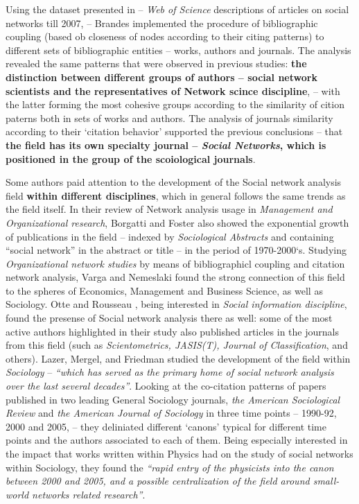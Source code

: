 \documentclass[11pt]{article} %
\begin{document}
Using the dataset presented in \citep{Understand} -- \textit{Web of Science} descriptions of articles on social networks till 2007, -- Brandes \citep{brandes} implemented the procedure of bibliographic coupling (based ob closeness of nodes according to their citing patterns) to different sets of bibliographic entities -- works, authors and journals. The analysis revealed the same patterns that were observed in previous studies: \textbf{the distinction between different groups of authors -- social network scientists and the representatives of Network scince discipline}, -- with the latter forming the most cohesive groups according to the similarity of cition paterns both in sets of works and authors. The analysis of journals similarity according to their `citation behavior' supported the previous conclusions\citep{normSci, leydes} -- that \textbf{the field has its own specialty journal -- \textit{Social Networks}, which is positioned in the group of the scoiological journals}.\medskip  

Some authors paid attention to the development of the Social network analysis field \textbf{within different disciplines}, which in general follows the same trends as the field itself. In their review of Network analysis usage in \textit{Management and Organizational research}, Borgatti and Foster \citep{borgatti} also showed the exponential growth of publications in the field -- indexed by \textit{Sociological Abstracts} and containing “social network” in the abstract or title -- in the period of 1970-2000`s. Studying \textit{Organizational network studies} by means of bibliographicl coupling and citation network analysis, Varga and Nemeslaki \citep{varga} found the strong connection of this field to the spheres of Economics, Management and Business Science, as well as Sociology. Otte and Rousseau \citep{SNAinf}, being interested in \textit{Social information discipline}, found the presense of Social network analysis there as well: some of the most active authors highlighted in their study also published articles in the journals from this field (such as \textit{Scientometrics, JASIS(T), Journal of Classification}, and others). Lazer, Mergel, and Friedman \citep{lazer} studied the development of the field within \textit{Sociology} -- \textit{``which has served as the primary home of social network analysis over the last several decades''}. Looking at the co-citation patterns of papers published in two leading General Sociology journals, \textit{the American Sociological Review} and \textit{the American Journal of Sociology} in three time points -- 1990-92, 2000 and 2005, -- they deliniated different `canons' typical for different time points and the authors associated to each of them. Being especially interested in the impact that works written within Physics had on the study of social networks within Sociology, they found the \textit{``rapid entry of the physicists into the canon between 2000 and 2005, and a possible centralization of the field around small-world networks related research''}.\medskip  
\end{document}
